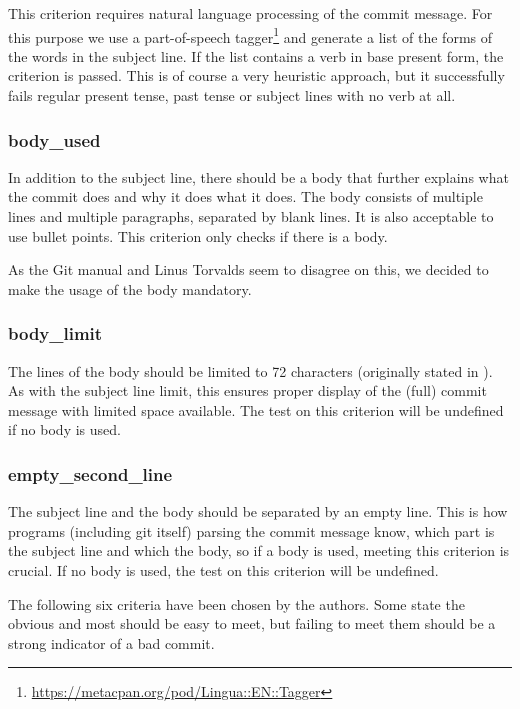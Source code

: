This criterion requires natural language processing of the commit message. For this purpose we use a part-of-speech tagger\footnote{\url{https://metacpan.org/pod/Lingua::EN::Tagger}} and generate a list of the forms of the words in the subject line. If the list contains a verb in base present form, the criterion is passed. This is of course a very heuristic approach, but it successfully fails regular present tense, past tense or subject lines with no verb at all.

\subsubsection{body\_used}
\label{subs:body_used}
In addition to the subject line, there should be a body that further explains what the commit does and why it does what it does\cite{OffGuide}. The body consists of multiple lines and multiple paragraphs, separated by blank lines. It is also acceptable to use bullet points. This criterion only checks if there is a body.

As the Git manual \cite{OffGuide} and Linus Torvalds \cite{SR} seem to disagree on this, we decided to make the usage of the body mandatory.

\subsubsection{body\_limit}
\label{subs:body_limit}
The lines of the body should be limited to 72 characters (originally stated in \cite{TP}). As with the subject line limit, this ensures proper display of the (full) commit message with limited space available. The test on this criterion will be undefined if no body is used.

\subsubsection{empty\_second\_line}
\label{subs:empty_second_line}
The subject line and the body should be separated by an empty line\cite{TP}. This is how programs (including git itself) parsing the commit message know, which part is the subject line and which the body, so if a body is used, meeting this criterion is crucial. If no body is used, the test on this criterion will be undefined.

\par\bigskip
The following six criteria have been chosen by the authors. Some state the obvious and most should be easy to meet, but failing to meet them should be a strong indicator of a bad commit.

